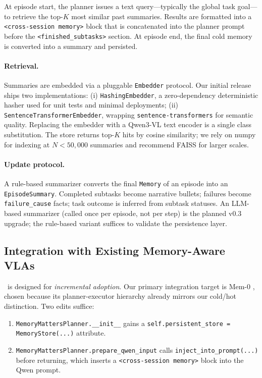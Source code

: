 At episode start, the planner issues a text query---typically the
global task goal---to retrieve the top-$K$ most similar past
summaries. Results are formatted into a \texttt{<cross-session
memory>} block that is concatenated into the planner prompt before
the \texttt{<finished\_subtasks>} section. At episode end, the final
cold memory is converted into a summary and persisted.

\paragraph{Retrieval.}
Summaries are embedded via a pluggable \texttt{Embedder} protocol.
Our initial release ships two implementations:
(i) \texttt{HashingEmbedder}, a zero-dependency deterministic hasher
used for unit tests and minimal deployments;
(ii) \texttt{SentenceTransformerEmbedder}, wrapping
\texttt{sentence-transformers} for semantic quality.
Replacing the embedder with a Qwen3-VL text encoder is a single
class substitution. The store returns top-$K$ hits by cosine
similarity; we rely on numpy for indexing at $N<50{,}000$
summaries and recommend FAISS for larger scales.

\paragraph{Update protocol.}
A rule-based summarizer converts the final \texttt{Memory} of an
episode into an \texttt{EpisodeSummary}. Completed subtasks become
narrative bullets; failures become \texttt{failure\_cause} facts;
task outcome is inferred from subtask statuses. An LLM-based
summarizer (called once per episode, not per step) is the planned
v0.3 upgrade; the rule-based variant suffices to validate the
persistence layer.

\subsection{Integration with Existing Memory-Aware VLAs}
\label{sec:method:integration}

\method\ is designed for \emph{incremental adoption}. Our primary
integration target is Mem-0 \cite{rmbench}, chosen because its
planner-executor hierarchy already mirrors our cold/hot distinction.
Two edits suffice:

\begin{enumerate}
\item \texttt{MemoryMattersPlanner.\_\_init\_\_} gains a
      \texttt{self.persistent\_store = MemoryStore(...)} attribute.
\item \texttt{MemoryMattersPlanner.prepare\_qwen\_input} calls
      \texttt{inject\_into\_prompt(...)} before returning, which
      inserts a \texttt{<cross-session memory>} block into the Qwen
      prompt.
\end{enumerate}

